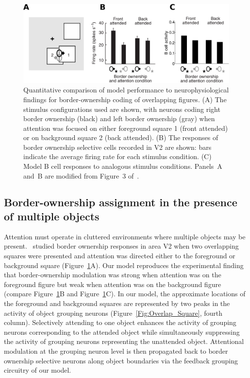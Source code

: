\begin{figure}[t]
\centering
\includegraphics[width=\textwidth]{Contour/figs/Fig7.eps}
\makeatletter
\let\@currsize\normalsize
\caption[Comparison of model results to the Qiu et al. experiments]{Quantitative comparison of model performance to neurophysiological findings \citep{Qiu_etal07} for border-ownership coding of  overlapping figures. (A) The stimulus configurations used are shown, with neurons coding right border ownership (black) and left border ownership (gray) when attention was focused on either foreground square 1 (front attended) or on background square 2 (back attended). (B) The responses of border ownership selective cells recorded in V2 are shown:  bars indicate the average firing rate for each stimulus condition. (C) Model B cell responses to analogous stimulus conditions.
Panels~A and~B are modified from Figure~3 of~\cite{Qiu_etal07}.}
\label{Fig:Overlap_Square_exp_model}
\end{figure}

\subsection{Border-ownership assignment in the presence of multiple objects}
\label{sec:BOS_overlap}

Attention must operate in cluttered environments where multiple
objects may be present.~\cite{Qiu_etal07} studied border ownership
responses in area V2 when two overlapping squares were presented and
attention was directed either to the foreground or background square
(Figure~\ref{Fig:Overlap_Square_exp_model}A). Our model reproduces the
experimental finding that border-ownership modulation was strong when
attention was on the foreground figure but weak when attention was on
the background figure (compare
Figure~\ref{Fig:Overlap_Square_exp_model}B and
Figure~\ref{Fig:Overlap_Square_exp_model}C).
In our model, the approximate locations of the foreground and
background squares are represented by two peaks in the activity of
object grouping neurons (Figure~\ref{Fig:Overlap_Square}, fourth
column). Selectively attending to one object enhances the activity of
grouping neurons corresponding to the attended object while
simultaneously suppressing the activity of grouping neurons
representing the unattended object. Attentional modulation at the
grouping neuron level is then propagated back to border ownership
selective neurons along object boundaries via the feedback grouping
circuitry of our model.

